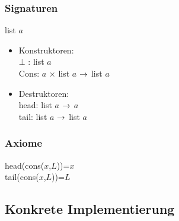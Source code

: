 \documentclass[a4paper]{scrartcl}
\begin{document}
\subsubsection*{Signaturen}
list $a$\\
\begin{itemize}
	\item Konstruktoren:\\
$\bot$ : list $a$\\
Cons: $a$ $\times$ list $a$ $\rightarrow$ list $a$\\
	\item Destruktoren:\\
head: list $a$ $\rightarrow$ $a$\\
tail: list $a$ $\rightarrow$ list $a$\\
\end{itemize}

\subsubsection*{Axiome}
head(cons($x$,$L$))=$x$\\
tail(cons($x$,$L$))=$L$\\



\subsection{Konkrete Implementierung}
\end{document}

